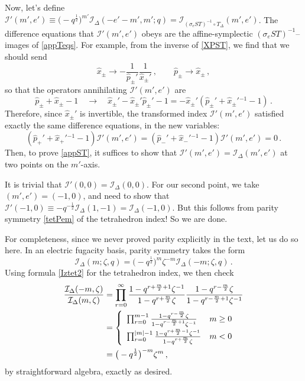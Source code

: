 \documentclass[11pt,letterpaper]{article}
\numberwithin{equation}{section}
\newcommand{\be}{\begin{equation}}
\newcommand{\ee}{\end{equation}}
\newcommand{\CI}{\mathcal{I}}
\begin{document}
Now, let's define $\CI'(m',e') \equiv \big(-q^{\frac12}\big)^{m'}\CI_\Delta(-e'-m',m';q) = \CI_{(\sigma_eST)^{-1}\circ T_\Delta}(m',e')$. The difference equations that $\CI'(m',e')$ obeys are the affine-symplectic $(\sigma_eST)^{-1}$--images of \eqref{appTeqs}. For example, from the inverse of \eqref{XPST}, we find that we should send
%
\be \hat x_\pm \to -\frac{1}{\hat p_\pm'}\frac{1}{\hat x_\pm'}\,,\qquad \hat p_\pm \to \hat x_\pm\,, \ee
%
so that the operators annihilating $\CI'(m',e')$ are
%
\be \hat p_\pm+\hat x_\pm-1\quad\to\quad \hat x_\pm'-\hat x_\pm'\hat p_\pm'-1 = -\hat x_\pm'(\hat p_\pm'+\hat x_\pm'{}^{-1}-1)\,. \label{appopsp}\ee
%
Therefore, since $\hat x_\pm'$ is invertible, the transformed index $\CI'(m',e')$ satisfied exactly the same difference equations, in the new variables:
%
\be (\hat p_+' + \hat x_+'{}^{-1}-1)\CI'(m',e') = (\hat p_-' + \hat x_-'{}^{-1}-1)\CI'(m',e') = 0\,. \ee
%
Then, to prove \eqref{appST}, it suffices to show that $\CI'(m',e')=\CI_\Delta(m',e')$ at two points on the $m'$-axis.

It is trivial that $\CI'(0,0)=\CI_\Delta(0,0)$. For our second point, we take $(m',e')=(-1,0)$, and need to show that $\CI'(-1,0)\equiv -q^{-\frac12}\CI_\Delta(1,-1) = \CI_\Delta(-1,0)$. But this follows from parity symmetry \eqref{tetPem} of the tetrahedron index! So we are done.

For completeness, since we never proved parity explicitly in the text, let us do so here. In an electric fugacity basis, parity symmetry takes the form
%
\be \CI_\Delta(m;\zeta,q) = \big(-q^{\frac12}\big)^m\zeta^{-m}\CI_\Delta(-m;\zeta,q)\,. \ee
%
Using formula \eqref{Iztet2} for the tetrahedron index, we then check
%
\begin{align*}
\frac{\CI_\Delta(-m,\zeta)}{\CI_\Delta(m,\zeta)}
&= \prod_{r=0}^\infty \frac{1-q^{r+\frac m2+1}\zeta^{-1}}{1-q^{r+\frac m2}\zeta} \frac{1-q^{r-\frac m2}\zeta}{1-q^{r-\frac m2+1}\zeta^{-1}} \\
&= \left\{ \begin{array}{l@{\quad}l}
   \prod_{r=0}^{m-1}\frac{1-q^{r-\frac m2}\zeta}{1-q^{r-\frac m2+1}\zeta^{-1}} & m \geq 0 \\[.2cm]
   \prod_{r=0}^{|m|-1}\frac{1-q^{r+\frac m2-1}\zeta^{-1}}{1-q^{r+\frac m2}\zeta} & m < 0
   \end{array}\right. \\
&= \big(-q^{\frac12}\big)^{-m}\zeta^m\,,
\end{align*}
%
by straightforward algebra, exactly as desired.
\end{document}
